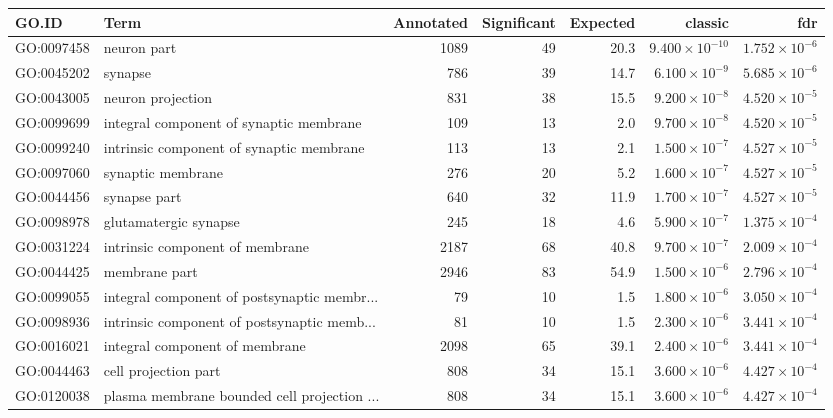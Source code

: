 \begin{table}[ht]
\centering
\begin{tabular}{llrrrrr}
  \hline
GO.ID & Term & Annotated & Significant & Expected & classic & fdr \\ 
  \hline
GO:0097458 & neuron part & 1089 & 49 & 20.3 & $9.400 \times 10^{-10}$ & $1.752 \times 10^{-6}$ \\ 
  GO:0045202 & synapse & 786 & 39 & 14.7 & $6.100 \times 10^{-9}$ & $5.685 \times 10^{-6}$ \\ 
  GO:0043005 & neuron projection & 831 & 38 & 15.5 & $9.200 \times 10^{-8}$ & $4.520 \times 10^{-5}$ \\ 
  GO:0099699 & integral component of synaptic membrane & 109 & 13 & 2.0 & $9.700 \times 10^{-8}$ & $4.520 \times 10^{-5}$ \\ 
  GO:0099240 & intrinsic component of synaptic membrane & 113 & 13 & 2.1 & $1.500 \times 10^{-7}$ & $4.527 \times 10^{-5}$ \\ 
  GO:0097060 & synaptic membrane & 276 & 20 & 5.2 & $1.600 \times 10^{-7}$ & $4.527 \times 10^{-5}$ \\ 
  GO:0044456 & synapse part & 640 & 32 & 11.9 & $1.700 \times 10^{-7}$ & $4.527 \times 10^{-5}$ \\ 
  GO:0098978 & glutamatergic synapse & 245 & 18 & 4.6 & $5.900 \times 10^{-7}$ & $1.375 \times 10^{-4}$ \\ 
  GO:0031224 & intrinsic component of membrane & 2187 & 68 & 40.8 & $9.700 \times 10^{-7}$ & $2.009 \times 10^{-4}$ \\ 
  GO:0044425 & membrane part & 2946 & 83 & 54.9 & $1.500 \times 10^{-6}$ & $2.796 \times 10^{-4}$ \\ 
  GO:0099055 & integral component of postsynaptic membr... & 79 & 10 & 1.5 & $1.800 \times 10^{-6}$ & $3.050 \times 10^{-4}$ \\ 
  GO:0098936 & intrinsic component of postsynaptic memb... & 81 & 10 & 1.5 & $2.300 \times 10^{-6}$ & $3.441 \times 10^{-4}$ \\ 
  GO:0016021 & integral component of membrane & 2098 & 65 & 39.1 & $2.400 \times 10^{-6}$ & $3.441 \times 10^{-4}$ \\ 
  GO:0044463 & cell projection part & 808 & 34 & 15.1 & $3.600 \times 10^{-6}$ & $4.427 \times 10^{-4}$ \\ 
  GO:0120038 & plasma membrane bounded cell projection ... & 808 & 34 & 15.1 & $3.600 \times 10^{-6}$ & $4.427 \times 10^{-4}$ \\ 

\end{tabular}
\end{table}
